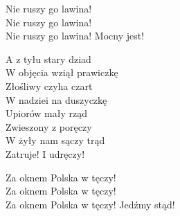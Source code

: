 \begin{text}
    Nie ruszy go lawina!\\
    Nie ruszy go lawina!\\
    Nie ruszy go lawina! Mocny jest!

    A z tyłu stary dziad\\
    W objęcia wziął prawiczkę\\
    Złośliwy czyha czart\\
    W nadziei na duszyczkę\\
    Upiorów mały rząd\\
    Zwieszony z poręczy\\
    W żyły nam sączy trąd\\
    Zatruje! I udręczy!

    Za oknem Polska w tęczy!\\
    Za oknem Polska w tęczy!\\
    Za oknem Polska w tęczy! Jedźmy stąd!
\end{text}
